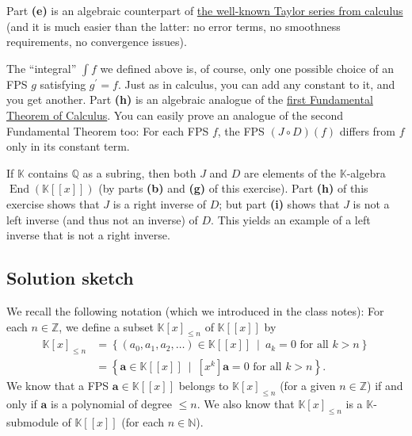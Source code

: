 \documentclass[paper=a4, fontsize=12pt]{scrartcl}%
\theoremstyle{plainsl}
\theoremstyle{definition}
\theoremstyle{remark}
\begin{document}
Part \textbf{(e)} is an algebraic counterpart of
\href{https://en.wikipedia.org/wiki/Taylor_series}{the well-known Taylor
series from calculus} (and it is much easier than the latter: no error terms,
no smoothness requirements, no convergence issues).

The ``integral'' $\int f$ we defined above is, of course, only one possible
choice of an FPS $g$ satisfying $g^{\prime}= f$. Just as in calculus, you can
add any constant to it, and you get another. Part \textbf{(h)} is an algebraic
analogue of the
\href{https://en.wikipedia.org/wiki/Fundamental_theorem_of_calculus#First_part}{first
Fundamental Theorem of Calculus}.
You can easily prove an analogue of the second Fundamental Theorem too:
For each FPS $f$, the FPS $\left(  J \circ D \right)
\left(  f \right)  $ differs from $f$ only in its constant term.

If $\mathbb{K}$ contains $\mathbb{Q}$ as a subring, then both $J$ and $D$ are
elements of the $\mathbb{K}$-algebra $\operatorname{End}\left(  \mathbb{K}%
\left[  \left[  x\right]  \right]  \right)  $ (by parts \textbf{(b)} and
\textbf{(g)} of this exercise). Part \textbf{(h)} of this exercise shows that
$J$ is a right inverse of $D$; but part \textbf{(i)} shows that $J$ is not a
left inverse (and thus not an inverse) of $D$. This yields an example of a
left inverse that is not a right inverse.

\subsection{Solution sketch}

We recall the following notation (which we introduced in the class notes): For
each $n\in\mathbb{Z}$, we define a subset $\mathbb{K}\left[  x\right]  _{\leq
n}$ of $\mathbb{K}\left[  \left[  x\right]  \right]  $ by%
\begin{align*}
\mathbb{K}\left[  x\right]  _{\leq n}  &  =\left\{  \left(  a_{0},a_{1}%
,a_{2},\ldots\right)  \in\mathbb{K}\left[  \left[  x\right]  \right]
\ \mid\ a_{k}=0\text{ for all }k>n\right\} \\
&  =\left\{  \mathbf{a}\in\mathbb{K}\left[  \left[  x\right]  \right]
\ \mid\ \left[  x^{k}\right]  \mathbf{a}=0\text{ for all }k>n\right\}  .
\end{align*}
We know that a FPS $\mathbf{a}\in\mathbb{K}\left[  \left[  x\right]  \right]
$ belongs to $\mathbb{K}\left[  x\right]  _{\leq n}$ (for a given
$n\in\mathbb{Z}$) if and only if $\mathbf{a}$ is a polynomial of degree $\leq
n$. We also know that $\mathbb{K}\left[  x\right]  _{\leq n}$ is a
$\mathbb{K}$-submodule of $\mathbb{K}\left[  \left[  x\right]  \right]  $ (for
each $n\in\mathbb{N}$).
\end{document}
